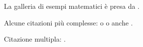 \documentclass{article}
\begin{document}
La galleria di esempi matematici è presa da \autocite{Graham1995}.

Alcune citazioni più complesse: \parencite{Graham1995} o
\textcite{Thomas2008} o anche .

\autocite[56]{Thomas2008}

\autocite[See][45-48]{Graham1995}

Citazione multipla: \autocite{Thomas2008,Graham1995}.

\printbibliography %
\end{document}
